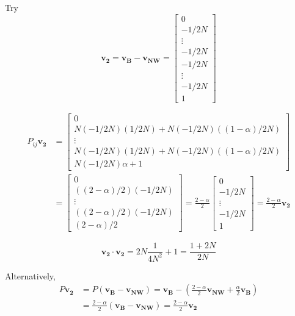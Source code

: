 \documentclass[11pt]{article}
\begin{document}
Try
\begin{equation}
\mathbf{v_2} = \mathbf{v_B} - \mathbf{v_{NW}} = \left[\begin{array}{c}
0 \\ -1/2N \\ \vdots \\ -1/2N \\ -1/2N \\ \vdots \\ -1/2N \\ 1
\end{array}\right]
\end{equation}

\begin{align}
P_{ij}\mathbf{v_2} &= \left[\begin{array}{c}
0\\
N(-1/2N)(1/2N) + N(-1/2N)((1-\alpha)/2N)\\
\vdots\\
N(-1/2N)(1/2N) + N(-1/2N)((1-\alpha)/2N) \\
N(-1/2N)\alpha + 1
\end{array}\right] \\
&=\left[\begin{array}{c}
0\\
((2-\alpha)/2)(-1/2N)\\
\vdots\\
((2-\alpha)/2)(-1/2N) \\
(2-\alpha)/2
\end{array}\right]= \frac{2-\alpha}{2}\left[\begin{array}{c}
0\\-1/2N\\\vdots\\-1/2N\\1
\end{array}\right]=\frac{2-\alpha}{2}\mathbf{v_2}
\end{align}

\begin{equation}
\mathbf{v_2}\cdot\mathbf{v_2} = 2N\frac{1}{4N^2} + 1 = \frac{1 + 2N}{2N}
\end{equation}

Alternatively,
\begin{align}
P\mathbf{v_2} &= P(\mathbf{v_B} - \mathbf{v_{NW}}) = \mathbf{v_B} - (\frac{2-\alpha}{2}\mathbf{v_{NW}} + \frac{\alpha}{2}\mathbf{v_B})\\
&=\frac{2-\alpha}{2}(\mathbf{v_B} - \mathbf{v_{NW}}) = \frac{2-\alpha}{2}\mathbf{v_2}
\end{align}
\end{document}
